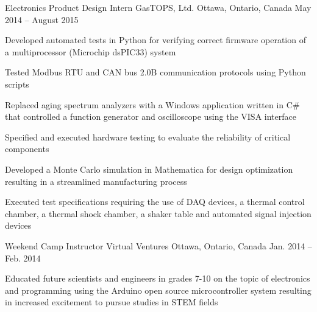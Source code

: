 \begin{cventries}
  \cventry
    {Electronics Product Design Intern} %
    {GasTOPS, Ltd.} %
    {Ottawa, Ontario, Canada} %
    {May 2014 – August 2015} %
    {
      \begin{cvitems} %
        \item {Developed automated tests in Python for verifying correct firmware operation of a multiprocessor (Microchip dsPIC33) system}
        \item {Tested Modbus RTU and CAN bus 2.0B communication protocols using Python scripts}
        \item {Replaced aging spectrum analyzers with a Windows application written in C\# that controlled a function generator and oscilloscope using the VISA interface}
        \item {Specified and executed hardware testing to evaluate the reliability of critical components}
        \item {Developed a Monte Carlo simulation in Mathematica for design optimization resulting in a streamlined manufacturing process}
        \item {Executed test specifications requiring the use of DAQ devices, a thermal control chamber, a thermal shock chamber, a shaker table and automated signal injection devices}
      \end{cvitems}
    }

  \cventry
    {Weekend Camp Instructor} %
    {Virtual Ventures} %
    {Ottawa, Ontario, Canada} %
    {Jan. 2014 – Feb. 2014} %
    {
      \begin{cvitems} %
        \item {Educated future scientists and engineers in grades 7-10 on the topic of electronics and programming using the Arduino open source microcontroller system resulting in increased excitement to pursue studies in STEM fields}
      \end{cvitems}
    }


\end{cventries}
